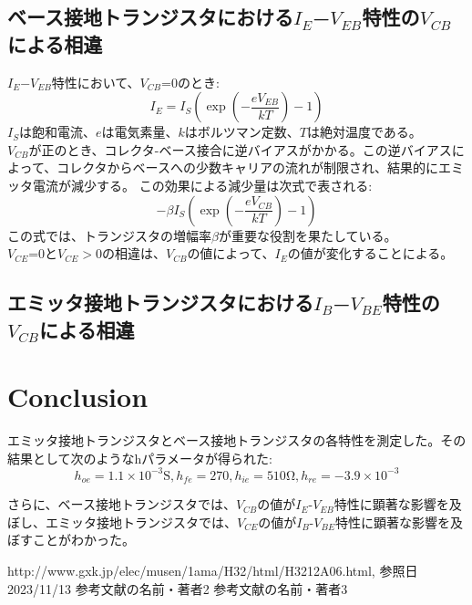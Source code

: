 \documentclass[a4paper,10pt]{jsarticle}
\begin{document}
\subsection{ベース接地トランジスタにおける$I_E$−$V_{EB}$特性の$V_{CB}$による相違}
$I_E$−$V_{EB}$特性において、$V_{CB}$=0のとき:
\begin{equation}
  I_E=I_S\left(\exp\left(-\frac{eV_{EB}}{kT}\right)-1\right)
\end{equation}
$I_S$は飽和電流、$e$は電気素量、$k$はボルツマン定数、$T$は絶対温度である。\\
$V_{CB}$が正のとき、コレクタ-ベース接合に逆バイアスがかかる。この逆バイアスによって、コレクタからベースへの少数キャリアの流れが制限され、結果的にエミッタ電流が減少する。
この効果による減少量は次式で表される:
\begin{equation}
  -\beta I_S\left(\exp\left(-\frac{eV_{CB}}{kT}\right)-1\right)
\end{equation}
この式では、トランジスタの増幅率$\beta$が重要な役割を果たしている。\\
$V_{CE}$=0と$V_{CE}>0$の相違は、$V_{CB}$の値によって、$I_E$の値が変化することによる。\\

\subsection{エミッタ接地トランジスタにおける$I_B$−$V_{BE}$特性の$V_{CB}$による相違}
\section{\textrm{Conclusion}}
エミッタ接地トランジスタとベース接地トランジスタの各特性を測定した。その結果として次のようなhパラメータが得られた:
$$
h_{oe}=1.1\times10^{-3} \text{S},　h_{fe}=270,　h_{ie}=510\text{Ω},　h_{re}=-3.9\times10^{-3}
$$

さらに、ベース接地トランジスタでは、\( V_{CB} \)の値が\( I_E \)-\( V_{EB} \)特性に顕著な影響を及ぼし、エミッタ接地トランジスタでは、\( V_{CE} \)の値が\( I_B \)-\( V_{BE} \)特性に顕著な影響を及ぼすことがわかった。


\begin{thebibliography}{文献数}
   http://www.gxk.jp/elec/musen/1ama/H32/html/H3212A06.html, 参照日2023/11/13
   参考文献の名前・著者2
   参考文献の名前・著者3
  \end{thebibliography}
\end{document}
